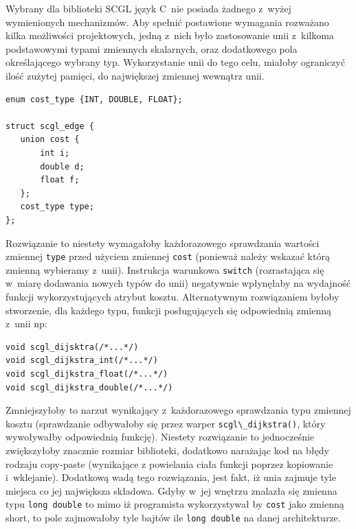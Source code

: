 \documentclass[a4paper,12pt,polish,twoside,openright]{thesis}
\newcommand\code[1]{\lstinline[style=line]{#1}}
\begin{document}
Wybrany dla biblioteki SCGL język C~nie posiada żadnego z~wyżej wymienionych mechanizmów.
Aby spełnić postawione wymagania rozważano kilka możliwości projektowych, jedną z~nich było zastosowanie unii z~kilkoma podstawowymi typami zmiennych skalarnych, oraz dodatkowego pola określającego wybrany typ.
Wykorzystanie unii do tego celu, miałoby ograniczyć ilość zużytej pamięci, do największej zmiennej wewnątrz unii.
\begin{lstlisting}[style=code,caption=Koszt krawędzi jako unia]
enum cost_type {INT, DOUBLE, FLOAT};

struct scgl_edge {
   union cost {
       int i;
       double d;
       float f;
   };
   cost_type type;
};
\end{lstlisting}
Rozwiązanie to niestety wymagałoby każdorazowego sprawdzania wartości zmiennej \code{type} przed użyciem zmiennej \code{cost} (ponieważ należy wskazać którą zmienną wybieramy z~unii).
Instrukcja warunkowa \code{switch} (rozrastająca się w~miarę dodawania nowych typów do unii) negatywnie wpłynęłaby na wydajność funkcji wykorzystujących atrybut kosztu.
Alternatywnym rozwiązaniem byłoby stworzenie, dla każdego typu, funkcji posługujących się odpowiednią zmienną z~unii np:
\begin{lstlisting}[style=coden]
void scgl_dijsktra(/*...*/)
void scgl_dijkstra_int(/*...*/)
void scgl_dijkstra_float(/*...*/)
void scgl_dijkstra_double(/*...*/)
\end{lstlisting}
Zmniejszyłoby to narzut wynikający z~każdorazowego sprawdzania typu zmiennej kosztu (sprawdzanie odbywałoby się przez warper \code{scgl\_dijkstra()}, który wywoływałby odpowiednią funkcję).
Niestety rozwiązanie to jednocześnie zwiększyłoby znacznie rozmiar biblioteki, dodatkowo narażając kod na błędy rodzaju copy-paste (wynikające z powielania ciała funkcji poprzez kopiowanie i~wklejanie).
Dodatkową wadą tego rozwiązania, jest fakt, iż unia zajmuje tyle miejsca co jej największa składowa. Gdyby w~jej wnętrzu znalazła się zmienna typu \code{long double} to mimo iż programista wykorzystywał by \code{cost} jako zmienną short, to pole zajmowałoby tyle bajtów ile \code{long double} na danej architekturze.
\end{document}
